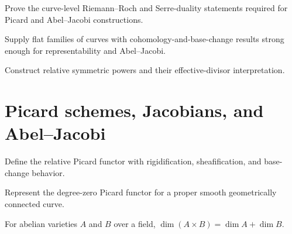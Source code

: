 \begin{theorem}\label{node:MT-TC-B2-RR-SERRE}
Prove the curve-level Riemann--Roch and Serre-duality statements required for
Picard and Abel--Jacobi constructions.
\leanpending
\end{theorem}

\begin{milestone}\label{node:MT-TC-C1-RELATIVE-COHOMOLOGY}
Supply flat families of curves with cohomology-and-base-change results strong
enough for representability and Abel--Jacobi.
\leanpending
\end{milestone}

\begin{milestone}\label{node:MT-TC-C2-SYMMETRIC-POWERS}
Construct relative symmetric powers and their effective-divisor
interpretation.
\leanpending
\end{milestone}

\section{Picard schemes, Jacobians, and Abel--Jacobi}

\begin{milestone}\label{node:MT-TC-D1-PICARD-FUNCTOR}
Define the relative Picard functor with rigidification, sheafification, and
base-change behavior.
\leanpending
\end{milestone}

\begin{theorem}\label{node:MT-TC-D2-PICARD-REPRESENTABILITY}
Represent the degree-zero Picard functor for a proper smooth geometrically
connected curve.
\leanpending
\end{theorem}

\begin{theorem}\label{node:MT-TC-E0-PRODUCT-DIM}
For abelian varieties \(A\) and \(B\) over a field,
\(\dim(A\times B)=\dim A+\dim B\).
\leanpending
\end{theorem}

